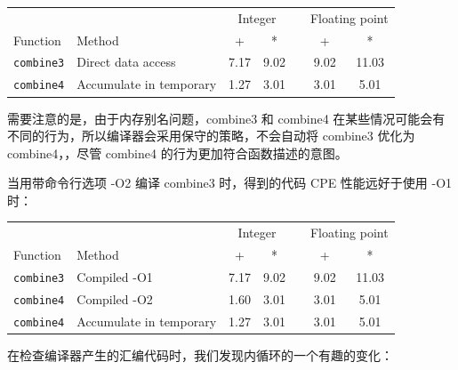 \begin{table}[!ht]
    \centering
    \begin{tabular}{llccccc}
        \toprule
        & & \multicolumn{2}{c}{Integer} & & \multicolumn{2}{c}{Floating point} \\
        \cmidrule{3-4} \cmidrule{6-7}
        Function & Method & + & * & & + & * \\
        \midrule
        \texttt{combine3} & Direct data access & 7.17 & 9.02 & & 9.02 & 11.03 \\
        \texttt{combine4} & Accumulate in temporary & 1.27 & 3.01 & & 3.01 & 5.01 \\
        \bottomrule
    \end{tabular}
\end{table}

需要注意的是，由于内存别名问题，combine3 和 combine4 在某些情况可能会有不同的行为，所以编译器会采用保守的策略，不会自动将 combine3 优化为 combine4，，尽管 combine4 的行为更加符合函数描述的意图。

当用带命令行选项 -O2 编译 combine3 时，得到的代码 CPE 性能远好于使用 -O1 时：

\begin{table}[!ht]
    \centering
    \begin{tabular}{llccccc}
        \toprule
        & & \multicolumn{2}{c}{Integer} & & \multicolumn{2}{c}{Floating point} \\
        \cmidrule{3-4} \cmidrule{6-7}
        Function & Method & + & * & & + & * \\
        \midrule
        \texttt{combine3} & Compiled -O1 & 7.17 & 9.02 & & 9.02 & 11.03 \\
        \texttt{combine4} & Compiled -O2 & 1.60 & 3.01 & & 3.01 & 5.01 \\
        \texttt{combine4} & Accumulate in temporary & 1.27 & 3.01 & & 3.01 & 5.01 \\
        \bottomrule
    \end{tabular}
\end{table}

在检查编译器产生的汇编代码时，我们发现内循环的一个有趣的变化：


